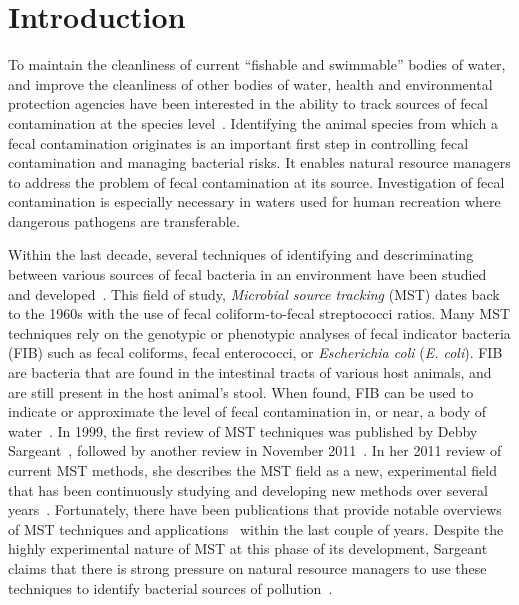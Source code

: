 \documentclass[12pt]{ucthesis}
\begin{document}
\pagestyle{plain}

\renewcommand{\baselinestretch}{1.66}


\chapter{Introduction}\label{chap:intro}
   To maintain the cleanliness of current ``fishable and swimmable'' bodies of
   water, and improve the cleanliness of other bodies of water, health and
   environmental protection agencies have been interested in the ability to
   track sources of fecal contamination at the species
   level~\cite{Scott:CurrentMST, Simpson:StateOf, Desmarais:SoilInfluence}.
   Identifying the animal species from which a fecal contamination originates
   is an important first step in controlling fecal contamination and managing
   bacterial risks. It enables natural resource managers to address the problem
   of fecal contamination at its source. Investigation of fecal contamination
   is especially necessary in waters used for human recreation where dangerous
   pathogens are transferable. 

   Within the last decade, several techniques of identifying and descriminating
   between various sources of fecal bacteria in an environment have been
   studied and developed~\cite{Sargeant:ReviewMST, Hagedorn:MST_TMDL,
   Lowe:FocusMST, Rivera:MSTCharacterization, Cornelison:MSTTools,
   Chase:FloridaMST}. This field of study, \textit{Microbial source tracking}
   (MST) dates back to the 1960s with the use of fecal coliform-to-fecal
   streptococci ratios. Many MST techniques rely on the genotypic or
   phenotypic analyses of fecal indicator bacteria (FIB) such as fecal
   coliforms, fecal enterococci, or \textit{Escherichia coli} (\textit{E.
   coli}). FIB are bacteria that are found in the intestinal tracts of various
   host animals, and are still present in the host animal's stool. When found,
   FIB can be used to indicate or approximate the level of fecal contamination
   in, or near, a body of water~\cite{Simpson:StateOf}. In 1999, the first
   review of MST techniques was published by Debby
   Sargeant~\cite{Sargeant:Methods}, followed by another review in November
   2011~\cite{Sargeant:ReviewMST}. In her 2011 review of current MST methods,
   she describes the MST field as a new, experimental field that has been
   continuously studying and developing new methods over several
   years~\cite{Sargeant:ReviewMST}. Fortunately, there have been publications
   that provide notable overviews of MST techniques and
   applications~\cite{Hagedorn:CaseStudies, Domingo:Current,
   Harwood:RapidMethods} within the last couple of years. Despite the highly
   experimental nature of MST at this phase of its development, Sargeant claims
   that there is strong pressure on natural resource managers to use these
   techniques to identify bacterial sources of
   pollution~\cite{Sargeant:ReviewMST}.
\end{document}
